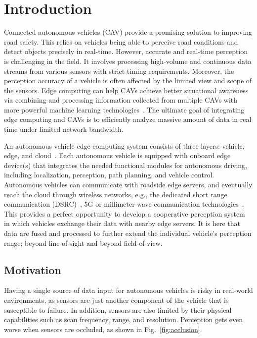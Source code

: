 \documentclass[sigconf]{acmart}
\begin{document}
\section{Introduction}
Connected autonomous vehicles (CAV) provide a promising solution to improving road safety. This relies on vehicles being able to perceive road conditions and detect objects precisely in real-time. However, accurate and real-time perception is challenging in the field. It involves processing high-volume and continuous data streams from various sensors with strict timing requirements. Moreover, the perception accuracy of a vehicle is often affected by the limited view and scope of the sensors. 
Edge computing can help CAVs achieve better situational awareness via combining and processing information collected from multiple CAVs with more powerful machine learning technologies~\cite{wang2018cavbench,shi2016edge}.
The ultimate goal of integrating edge computing and CAVs is to efficiently analyze massive amount of data in real time under limited network bandwidth.  

An autonomous vehicle edge computing system consists of three layers: vehicle, edge, and cloud~\cite{vedge}.
Each autonomous vehicle is equipped with  onboard edge device(s) that integrates the needed functional modules for autonomous driving, including localization, perception, path planning, and vehicle control.
Autonomous vehicles can communicate with roadside edge servers, and eventually reach the cloud through wireless networks, e.g., the dedicated short range communication (DSRC)~\cite{dsrc}, 5G or millimeter-wave communication technologies~\cite{va2016millimeter}. 
This provides a perfect opportunity to develop a cooperative perception system in which vehicles exchange their data with nearby edge servers. It is here that data are fused and processed to further extend the individual vehicle's perception range; beyond line-of-sight and beyond field-of-view.  

\subsection{Motivation}

Having a single source of data input for autonomous vehicles is risky in real-world environments, as sensors are just another component of the vehicle that is susceptible to failure. 
In addition, sensors are also limited by their physical capabilities such as scan frequency, range, and resolution. 
Perception gets even worse when sensors are occluded, as shown in Fig.~\ref{fig:acclusion}.
\end{document}
